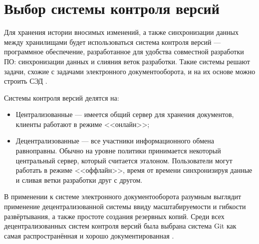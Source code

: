 \section{Выбор системы контроля версий} \label{technologic_cvs}

Для хранения истории вносимых изменений, а также синхронизации данных между хранилищами будет использоваться система контроля версий --- программное обеспечение, разработанное для удобства совместной разработки ПО: синхронизации данных и слияния веток разработки. Такие системы решают задачи, схожие с задачами  электронного документооборота, и на их основе можно строить СЭД \cite{my_conference_2013}.

\vspace{\baselineskip}
Системы контроля версий делятся на:
\begin{itemize}
		\item Централизованные --- имеется общий сервер для хранения документов, клиенты работают в режиме <<онлайн>>;
		\item Децентрализованные --- все участники информационного обмена равноправны. Обычно на уровне политики принимается некоторый центральный сервер, который считается эталоном. Пользователи могут работать в режиме <<оффлайн>>, время от времени синхронизируя данные и сливая ветки разработки друг с другом.
	\end{itemize}

\vspace{\baselineskip}
В применении к системе электронного документооборота разумным выглядит применение децентрализованной системы ввиду масштабируемости и гибкости развёртывания, а также простоте создания резервных копий. Среди всех децентрализованных систем контроля версий была выбрана система Git как самая распространённая и хорошо документированная \cite{my_conference_2013}.